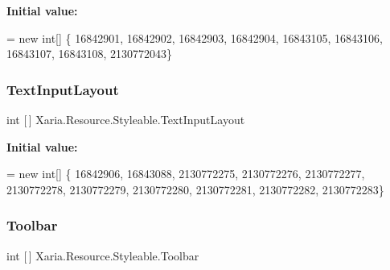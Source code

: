 {\bfseries Initial value\+:}
\begin{DoxyCode}
= \textcolor{keyword}{new} \textcolor{keywordtype}{int}[] \{
                    16842901,
                    16842902,
                    16842903,
                    16842904,
                    16843105,
                    16843106,
                    16843107,
                    16843108,
                    2130772043\}
\end{DoxyCode}
\mbox{\label{classXaria_1_1Resource_1_1Styleable_ac30c9c932738395aa2d03faaa9d4eb14}} 
\subsubsection{\texorpdfstring{Text\+Input\+Layout}{TextInputLayout}}
{\footnotesize\ttfamily int \mbox{[}$\,$\mbox{]} Xaria.\+Resource.\+Styleable.\+Text\+Input\+Layout\hspace{0.3cm}{\ttfamily [static]}}

{\bfseries Initial value\+:}
\begin{DoxyCode}
= \textcolor{keyword}{new} \textcolor{keywordtype}{int}[] \{
                    16842906,
                    16843088,
                    2130772275,
                    2130772276,
                    2130772277,
                    2130772278,
                    2130772279,
                    2130772280,
                    2130772281,
                    2130772282,
                    2130772283\}
\end{DoxyCode}
\mbox{\label{classXaria_1_1Resource_1_1Styleable_a7e8a83d5003c79247854212a9c6b722e}} 
\subsubsection{\texorpdfstring{Toolbar}{Toolbar}}
{\footnotesize\ttfamily int \mbox{[}$\,$\mbox{]} Xaria.\+Resource.\+Styleable.\+Toolbar\hspace{0.3cm}{\ttfamily [static]}}


